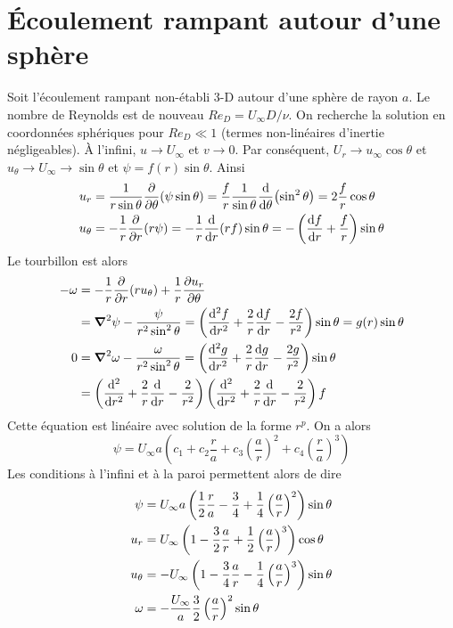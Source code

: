   \section{Écoulement rampant autour d'une sphère}
    Soit l'écoulement rampant non-établi 3-D autour d'une sphère de rayon $a$. Le nombre de Reynolds est de nouveau $Re_D = U_\infty D / \nu$. On recherche la solution en coordonnées sphériques pour $Re_D \ll 1$ (termes non-linéaires d'inertie négligeables). À l'infini, $u \rightarrow U_\infty$ et $v \rightarrow 0$. Par conséquent, $U_r \rightarrow u_\infty \cos \theta$ et $u_\theta \rightarrow U_\infty \rightarrow \sin \theta$ et $\psi = f(r)\sin\theta$. Ainsi
    \begin{equation}
      \begin{aligned}
        u_r &= \frac{1}{r\sin\theta} \pdv{\theta}(\psi \sin\theta) = \frac{f}{r} \frac{1}{\sin\theta} \dv{\theta}(\sin^2 \theta) = 2 \frac{f}{r} \cos{\theta}\\
        u_\theta &= -\frac{1}{r}\pdv{r}(r \psi) = -\frac{1}{r} \dv{r}(rf) \sin \theta = - \left( \dv{f}{r} + \frac{f}{r} \right)\sin \theta
      \end{aligned}
    \end{equation}
    Le tourbillon est alors
    \begin{align}
      -\omega &= -\frac{1}{r} \pdv{r} (r u_\theta) + \frac{1}{r} \pdv{u_r}{\theta}\\ &= \grad^2 \psi - \frac{\psi}{r^2 \sin^2\theta} =
      \left(\dv[2]{f}{r} + \frac{2}{r} \dv{f}{r} - \frac{2f}{r^2}\right) \sin{\theta} = g(r) \sin{\theta}\\
      0 &= \grad^2\omega - \frac{\omega}{r^2\sin^2 \theta} = \left(\dv[2]{g}{r} + \frac{2}{r} \dv{g}{r} - \frac{2g}{r^2}\right) \sin\theta \\
      &= \left(\dv[2]{r} + \frac{2}{r} \dv{r} -\frac{2}{r^2}\right)\left(\dv[2]{r} + \frac{2}{r} \dv{r} -\frac{2}{r^2}\right)f
    \end{align}
    Cette équation est linéaire avec solution de la forme $r^p$. On a alors
    \begin{equation}
      \psi = U_\infty a \left(c_1 + c_2 \frac{r}{a} + c_3\left(\frac{a}{r}\right)^2 + c_4 \left(\frac{r}{a}\right)^3\right)
    \end{equation}
    Les conditions à l'infini et à la paroi permettent alors de dire
    \begin{equation}
      \begin{aligned}
        \psi &= U_\infty a \left(\frac{1}{2}\frac{r}{a} - \frac{3}{4} + \frac{1}{4}\left(\frac{a}{r}\right)^2\right)\sin \theta\\
        u_r &= U_\infty \left(1 - \frac{3}{2}\frac{a}{r} + \frac{1}{2}\left(\frac{a}{r}\right)^3\right) \cos \theta \\
        u_\theta &= -U_\infty \left(1 - \frac{3}{4} \frac{a}{r} - \frac{1}{4}\left(\frac{a}{r}\right)^3\right) \sin \theta \\
        \omega &= - \frac{U_\infty}{a} \frac{3}{2} \left(\frac{a}{r}\right)^2 \sin \theta
      \end{aligned}
    \end{equation}
